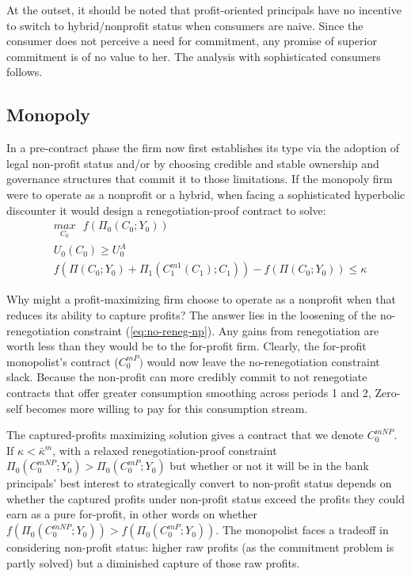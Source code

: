\documentclass[11pt,english]{article}
\theoremstyle{plain}
\theoremstyle{definition}
\begin{document}
At the outset, it should be noted that profit-oriented principals
have no incentive to switch to hybrid/nonprofit status when consumers
are naive. Since the consumer does not perceive a need for commitment,
any promise of superior commitment is of no value to her. The analysis
with sophisticated consumers follows.

\subsection{Monopoly}

In a pre-contract phase the firm now first establishes its type via
the adoption of legal non-profit status and/or by choosing credible
and stable ownership and governance structures that commit it to those
limitations. If the monopoly firm were to operate as a nonprofit or
a hybrid, when facing a sophisticated hyperbolic discounter it would
design a renegotiation-proof contract to solve:
\begin{align}
 & \underset{C_{0}}{max}\text{ }f\left(\Pi_{0}\left(C_{0};Y_{0}\right)\right)\\
 & U_{0}\left(C_{0}\right)\geq U_{0}^{A}\\
 & f\left(\Pi\left(C_{0};Y_{0}\right)+\Pi_{1}\left(C_{1}^{m1}\left(C_{1}\right);C_{1}\right)\right)-f\left(\Pi\left(C_{0};Y_{0}\right)\right)\leq\kappa\label{eq:no-reneg-np}
\end{align}

Why might a profit-maximizing firm choose to operate as a nonprofit
when that reduces its ability to capture profits? The answer lies
in the loosening of the no-renegotiation constraint (\ref{eq:no-reneg-np}).
Any gains from renegotiation are worth less than they would be to
the for-profit firm. Clearly, the for-profit monopolist's contract
($C_{0}^{mP})$ would now leave the no-renegotiation constraint slack.
Because the non-profit can more credibly commit to not renegotiate
contracts that offer greater consumption smoothing across periods
1 and 2, Zero-self becomes more willing to pay for this consumption
stream.

The captured-profits maximizing solution gives a contract that we
denote $C_{0}^{mNP}$. If $\kappa<\bar{\kappa}^{m}$, with a relaxed
renegotiation-proof constraint $\Pi_{0}(C_{0}^{mNP};Y_{0})>\Pi_{0}(C_{0}^{mP};Y_{0})$
but whether or not it will be in the bank principals' best interest
to strategically convert to non-profit status depends on whether the
captured profits under non-profit status exceed the profits they could
earn as a pure for-profit, in other words on whether $f\left(\Pi_{0}(C_{0}^{mNP};Y_{0})\right)>f\left(\Pi_{0}(C_{0}^{mP};Y_{0})\right)$.
The monopolist faces a tradeoff in considering non-profit status:
higher raw profits (as the commitment problem is partly solved) but
a diminished capture of those raw profits.
\end{document}
